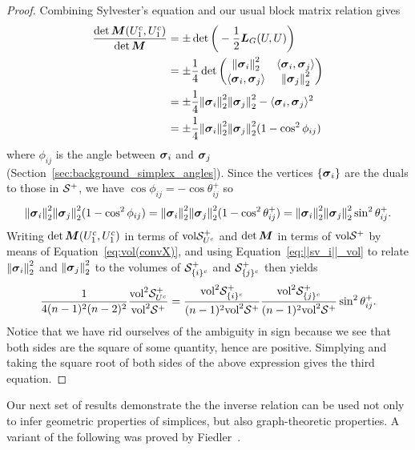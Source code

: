 \begin{proof}
	Combining Sylvester's equation and our usual block matrix relation gives 
	\begin{align*}
	\frac{\det\M(U_1^c,U_1^c)}{\det \M} &= \pm \det \bigg(-\frac{1}{2}\L_G(U,U)\bigg) \\
	&= 
	\pm \frac{1}{4}\det\begin{pmatrix}
	\norm{\sv_i}_2^2 & \la \sv_i,\sv_j\ra \\
	\la \sv_i,\sv_j\ra & \norm{\sv_j}_2^2 
	\end{pmatrix} \\
	&=\pm \frac{1}{4}\norm{\sv_i}_2^2\norm{\sv_j}_2^2 - \la \sv_i,\sv_j\ra^2 \\
	&= \pm\frac{1}{4}\norm{\sv_i}_2^2\norm{\sv_j}_2^2(1 - \cos^2\phi_{ij})
	\end{align*}
	where $\phi_{ij}$ is the angle between $\vb*{\sigma}_i$ and $\vb*{\sigma}_j$ (Section~\ref{sec:background_simplex_angles}). Since the vertices $\{\vb*{\sigma}_i\}$ are the  duals  to those in $\mathcal{S}^+$, we have $\cos\phi_{ij}=-\cos\theta_{ij}^+$  so \[\norm{\vb*{\sigma}_i}_2^2\norm{\vb*{\sigma}_j}_2^2(1 - \cos^2\phi_{ij}) = \norm{\vb*{\sigma}_i}_2^2\norm{\vb*{\sigma}_j}_2^2(1 - \cos^2\theta_{ij}^+) =  \norm{\vb*{\sigma}_i}_2^2\norm{\vb*{\sigma}_j}_2^2\sin^2\theta_{ij}^+.\]   
	Writing $\det\M(U_1^c,U_1^c)$  in terms of $\textnormal{vol}\mathcal{S}_{U^c}^+$ and $\det \M$  in terms of $\textnormal{vol}\mathcal{S}^+$ by  means of Equation~\eqref{eq:vol(convX)}, and using Equation~\eqref{eq:||sv_i||_vol} to relate $\norm{\vb*{\sigma}_i}_2^2$ and $\norm{\vb*{\sigma}_j}_2^2$  to  the volumes of $\mathcal{S}_{\{i\}^c}^+$  and $\mathcal{S}_{\{j\}^c}^+$ then yields 
	\begin{align*}
	\frac{1}{4(n-1)^2(n-2)^2}\frac{\textnormal{vol}^2\mathcal{S}_{U^c}^+}{\textnormal{vol}^2\mathcal{S}^+} =  \frac{\textnormal{vol}^2\mathcal{S}_{\{i\}^c}^+}{(n-1)^2\textnormal{vol}^2\mathcal{S}^+}\frac{\textnormal{vol}^2\mathcal{S}_{\{j\}^c}^+}{(n-1)^2\textnormal{vol}^2\mathcal{S}^+}\sin^2\theta_{ij}^+.
	\end{align*}
	Notice that we have rid ourselves  of the ambiguity in sign because we see that both  sides are the square of some quantity, hence are  positive. 
	Simplying and taking the square root of both sides of the above expression gives the third equation.
\end{proof}





Our next set of results demonstrate the the inverse relation can be used not only to infer geometric properties of simplices, but also graph-theoretic properties. A variant of the following  was proved by Fiedler~\cite{fiedler2011matrices}. 

